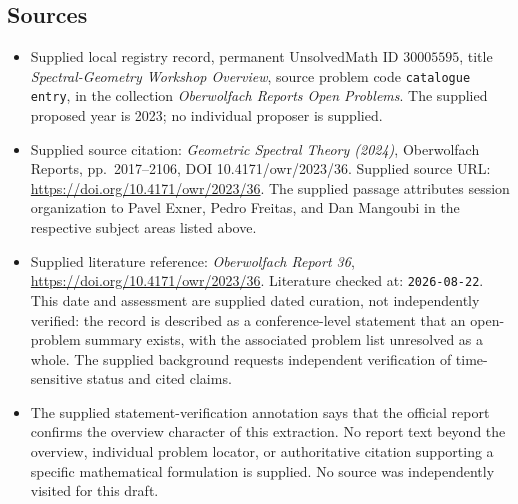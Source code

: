 \documentclass[11pt]{article}
\begin{document}
\subsection{Sources}
\begin{itemize}
\item Supplied local registry record, permanent UnsolvedMath ID \(30005595\), title \emph{Spectral-Geometry Workshop Overview}, source problem code \texttt{catalogue entry}, in the collection \emph{Oberwolfach Reports Open Problems}. The supplied proposed year is 2023; no individual proposer is supplied.
\item Supplied source citation: \emph{Geometric Spectral Theory (2024)}, Oberwolfach Reports, pp.~2017--2106, DOI 10.4171/owr/2023/36. Supplied source URL: \url{https://doi.org/10.4171/owr/2023/36}. The supplied passage attributes session organization to Pavel Exner, Pedro Freitas, and Dan Mangoubi in the respective subject areas listed above.
\item Supplied literature reference: \emph{Oberwolfach Report 36}, \url{https://doi.org/10.4171/owr/2023/36}. Literature checked at: \texttt{2026-08-22}. This date and assessment are supplied dated curation, not independently verified: the record is described as a conference-level statement that an open-problem summary exists, with the associated problem list unresolved as a whole. The supplied background requests independent verification of time-sensitive status and cited claims.
\item The supplied statement-verification annotation says that the official report confirms the overview character of this extraction. No report text beyond the overview, individual problem locator, or authoritative citation supporting a specific mathematical formulation is supplied. No source was independently visited for this draft.
\end{itemize}
\end{document}
